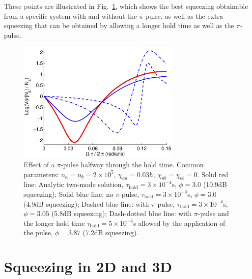 \documentclass{iopart}
\begin{document}
These points are illustrated in Fig.~\ref{piPulseFig}, which shows the best squeezing obtainable from a specific system with and without the $\pi$-pulse, as well as the extra squeezing that can be obtained by allowing a longer hold time as well as the $\pi$-pulse.
\begin{figure}
    \centering
    \includegraphics[width=8cm]{figures/pi_pulse.eps}
    \caption{Effect of a $\pi$-pulse halfway through the hold time. Common parameters: $n_a = n_b =2 \times 10^5$, $\chi_{aa}=0.03\hbar$, $\chi_{ab}=\chi_{bb}=0$. Solid red line: Analytic two-mode solution, $\tau_{\mathrm{hold}}=3\times 10^{-4}$s, $\phi=3.0$ (10.9dB squeezing); Solid blue line: no $\pi$-pulse, $\tau_{\mathrm{hold}}=3\times 10^{-4}$s, $\phi=3.0$ (4.9dB squeezing);  Dashed blue line: with $\pi$-pulse, $\tau_{\mathrm{hold}}=3\times 10^{-4}$s, $\phi=3.05$ (5.8dB squeezing); Dash-dotted blue line: with $\pi$-pulse and the longer hold time $\tau_{\mathrm{hold}}=5\times 10^{-4}$s allowed by the application of the pulse, $\phi=3.87$ (7.2dB squeezing).}
    \label{piPulseFig}
\end{figure}

\section{Squeezing in 2D and 3D}
\end{document}
